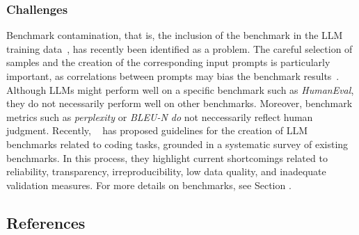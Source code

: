 \subsubsection{Challenges}

Benchmark contamination, that is, the inclusion of the benchmark in the LLM training data~\cite{DBLP:journals/corr/abs-2410-16186}, has recently been identified as a problem.
The careful selection of samples and the creation of the corresponding input prompts is particularly important, as correlations between prompts may bias the benchmark results~\cite{DBLP:conf/acl/SiskaMAB24}.
Although LLMs might perform well on a specific benchmark such as \emph{HumanEval}, they do not necessarily perform well on other benchmarks.
Moreover, benchmark metrics such as \emph{perplexity} or \emph{BLEU-N do} not neccessarily reflect human judgment.
Recently, \citeauthor{cao2025should}~\cite{cao2025should} has proposed guidelines for the creation of LLM benchmarks related to coding tasks, grounded in a systematic survey of existing benchmarks. 
In this process, they highlight current shortcomings related to reliability, transparency, irreproducibility, low data quality, and inadequate validation measures.
For more details on benchmarks, see Section \benchmarksmetrics. 

\subsection{References}





